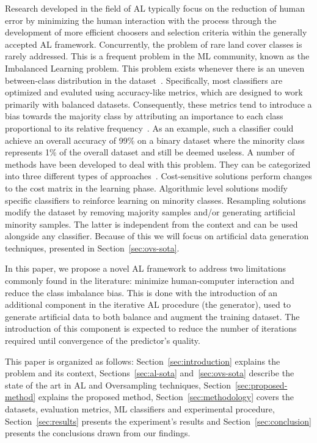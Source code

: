 \documentclass[parskip=full]{scrartcl}
\begin{document}
Research developed in the field of AL typically focus on the reduction of
human error by minimizing the human interaction with the process through the
development of more efficient choosers and selection criteria within the
generally accepted AL framework. Concurrently, the problem of rare land cover
classes is rarely addressed. This is a frequent problem in the ML community,
known as the Imbalanced Learning problem. This problem exists whenever there
is an uneven between-class distribution in the dataset~\cite{Chawla2004}.
Specifically, most classifiers are optimized and evaluted using accuracy-like
metrics, which are designed to work primarily with balanced datasets.
Consequently, these metrics tend to introduce a bias towards the majority
class by attributing an importance to each class proportional to its relative
frequency~\cite{Maxwell2018}. As an example, such a classifier could achieve
an overall accuracy of 99\% on a binary dataset where the minority class
represents 1\% of the overall dataset and still be deemed useless. A number of
methods have been developed to deal with this problem. They can be categorized
into three different types of approaches~\cite{Fernandez2013,Kaur2019}.
Cost-sensitive solutions perform changes to the cost matrix in the learning
phase. Algorithmic level solutions modify specific classifiers to reinforce
learning on minority classes. Resampling solutions modify the dataset by
removing majority samples and/or generating artificial minority samples. The
latter is independent from the context and can be used alongside any
classifier. Because of this we will focus on artificial data generation
techniques, presented in Section~\ref{sec:ovs-sota}.

In this paper, we propose a novel AL framework to address two limitations
commonly found in the literature: minimize human-computer interaction and
reduce the class imbalance bias. This is done with the introduction of an
additional component in the iterative AL procedure (the generator), used to
generate artificial data to both balance and augment the training dataset. The
introduction of this component is expected to reduce the number of iterations
required until convergence of the predictor's quality.

This paper is organized as follows: Section~\ref{sec:introduction} explains
the problem and its context, Sections~\ref{sec:al-sota} and~\ref{sec:ovs-sota}
describe the state of the art in AL and Oversampling techniques,
Section~\ref{sec:proposed-method} explains the proposed method,
Section~\ref{sec:methodology} covers the datasets, evaluation metrics, ML
classifiers and experimental procedure, Section~\ref{sec:results} presents the
experiment's results and Section~\ref{sec:conclusion} presents the conclusions
drawn from our findings.
\end{document}
